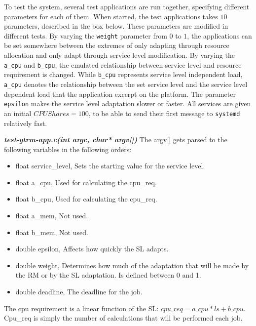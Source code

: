 \documentclass[nobiblatex]{LTHthesis}
\begin{document}
To test the system, several test applications are run together, specifying
different parameters for each of them.%
When started, the test applications takes $10$ parameters, described in 
the box below. These parameters are modified in different tests. By 
varying the \texttt{weight} parameter from $0$ to $1$, the applications can 
be set somewhere between the extremes of only adapting through resource
allocation and only adapt through service level modification.
By varying the \texttt{a\_cpu} and \texttt{b\_cpu}, the emulated relationship
between service level and resource requirement is changed. While
\texttt{b\_cpu} represents service level independent load, \texttt{a\_cpu}
denotes the relationship between the set service level and the service level
dependent load that the application excerpt on the platform. The parameter
\texttt{epsilon} makes the service level adaptation slower or faster. All
services are given an initial $CPUShares = 100$, to be able to send their first message to \texttt{systemd} relatively fast.

\begin{framed}
\begin{flushleft}
	\textbf{\emph{test-gtrm-app.c(int argc, char* argv[])}} \newline
	The argv[] gets parsed to the following variables in the following 
  orders:
	\begin{itemize}
		\item float service\_level, Sets the starting value for the service 
      level.
		\item float a\_cpu, Used for calculating the cpu\_req.
		\item float b\_cpu, Used for calculating the cpu\_req.
		\item float a\_mem, Not used.
		\item float b\_mem, Not used.
		\item double epsilon, Affects how quickly the SL adapts.
		\item double weight, Determines how much of the adaptation that will 
      be made by the RM or by the SL adaptation. Is defined between 0 and 1.
		\item double deadline, The deadline for the job.
	\end{itemize}
	The cpu requirement is a linear function of the SL: 
  $cpu\_req = a\_cpu*ls +b\_cpu  $. Cpu\_req is simply the number 
  of calculations that will be performed each job. 
\end{flushleft}
\end{framed}	
\end{document}
